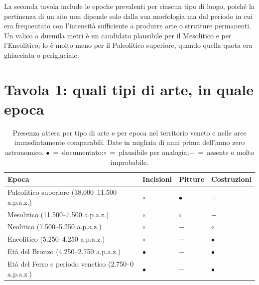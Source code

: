 La seconda tavola include le epoche prevalenti per ciascun tipo di luogo, poiché la pertinenza di un sito non dipende solo dalla sua morfologia ma dal periodo in cui era frequentato con l'intensità sufficiente a produrre arte o strutture permanenti. Un valico a duemila metri è un candidato plausibile per il Mesolitico e per l'Eneolitico; lo è molto meno per il Paleolitico superiore, quando quella quota era ghiacciata o periglaciale.

\section{Tavola 1: quali tipi di arte, in quale epoca}

\begin{table}[h]
\small
\setlength{\extrarowheight}{3pt}
\caption{Presenza attesa per tipo di arte e per epoca nel territorio veneto e nelle aree immediatamente comparabili. Date in migliaia di anni prima dell'anno zero astronomico. $\bullet$~=~documentato;\enspace $\circ$~=~plausibile per analogia;\enspace $-$~=~assente o molto improbabile.}
\label{tab:bilancio_tipi}
\begin{tabularx}{\textwidth}{>{\raggedright\arraybackslash}X
                              >{\centering\arraybackslash}p{2.0cm}
                              >{\centering\arraybackslash}p{2.0cm}
                              >{\centering\arraybackslash}p{2.4cm}}
\toprule
\textbf{Epoca} & \textbf{Incisioni} & \textbf{Pitture} & \textbf{Costruzioni} \\
\midrule
\rowcolor{blue!8}
Paleolitico superiore (38.000--11.500 a.p.a.z.) & $\circ$ & $\bullet$ & $-$ \\
Mesolitico (11.500--7.500 a.p.a.z.) & $\circ$ & $\circ$ & $-$ \\
\rowcolor{blue!8}
Neolitico (7.500--5.250 a.p.a.z.) & $\circ$ & $-$ & $\circ$ \\
Eneolitico (5.250--4.250 a.p.a.z.) & $\circ$ & $-$ & $\bullet$ \\
\rowcolor{blue!8}
Età del Bronzo (4.250--2.750 a.p.a.z.) & $\bullet$ & $-$ & $\bullet$ \\
Età del Ferro e periodo venetico (2.750--0 a.p.a.z.) & $\bullet$ & $-$ & $\bullet$ \\
\bottomrule
\end{tabularx}
\end{table}

